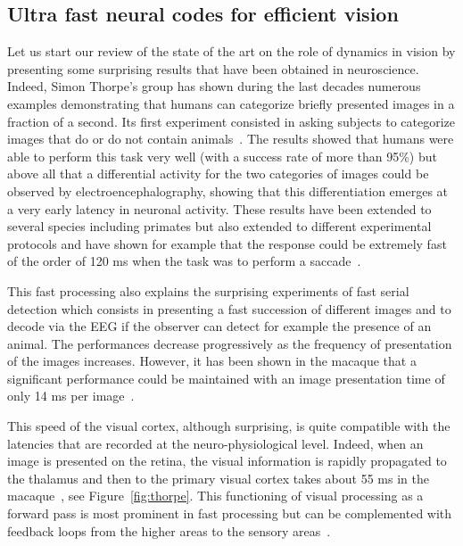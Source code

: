 \documentclass[brainsci, %
               review,submit,pdftex,moreauthors]{Definitions/mdpi}
\begin{document}
\subsection{Ultra fast neural codes for efficient vision}
%
Let us start our review of the state of the art on the role of dynamics in vision by presenting some surprising results that have been obtained in neuroscience. Indeed, Simon Thorpe's group has shown during the last decades numerous examples demonstrating that humans can categorize briefly presented images in a fraction of a second. Its first experiment consisted in asking subjects to categorize images that do or do not contain animals~\citep{thorpe_speed_1996}. The results showed that humans were able to perform this task very well (with a success rate of more than 95\%) but above all that a differential activity for the two categories of images could be observed by electroencephalography, showing that this differentiation emerges at a very early latency in neuronal activity. These results have been extended to several species including primates but also extended to different experimental protocols and have shown for example that the response could be extremely fast of the order of 120 ms when the task was to perform a saccade~\citep{kirchner_ultra-rapid_2006}.

This fast processing also explains the surprising experiments of fast serial detection which consists in presenting a fast succession of different images and to decode via the EEG if the observer can detect for example the presence of an animal. The performances decrease progressively as the frequency of presentation of the images increases. However, it has been shown in the macaque that a significant performance could be maintained with an image presentation time of only 14 ms per image~\citep{keysers_speed_2001}.

This speed of the visual cortex, although surprising, is quite compatible with the latencies that are recorded at the neuro-physiological level. Indeed, when an image is presented on the retina, the visual information is rapidly propagated to the thalamus and then to the primary visual cortex takes about 55 ms in the macaque~\citep{nowak_timing_1997}, see Figure~\ref{fig:thorpe}. This functioning of visual processing as a forward pass is most prominent in fast processing but can be complemented with feedback loops from the higher areas to the sensory areas~\citep{lamme_distinct_2000}.
\end{document}
